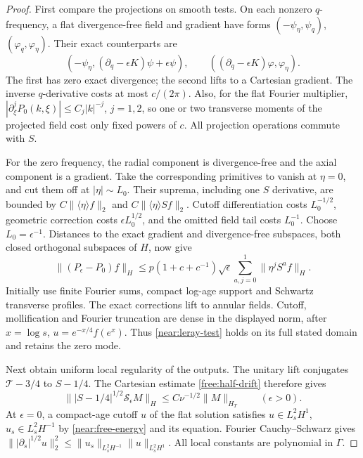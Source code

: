 \begin{proof}
First compare the projections on smooth tests. On each nonzero
\(q\)-frequency, a flat divergence-free field and gradient have forms
\((-\psi_\eta,\psi_q)\), \((\varphi_q,\varphi_\eta)\).
Their exact counterparts are
\[
 (-\psi_\eta,(\partial_q-\epsilon K)\psi+\epsilon\psi),
 \qquad ((\partial_q-\epsilon K)\varphi,\varphi_\eta).
\]
The first has zero exact divergence; the second lifts to a Cartesian
gradient. The inverse \(q\)-derivative costs at most \(c/(2\pi)\).
Also, for the flat Fourier multiplier,
\(|\partial_\xi^jP_0(k,\xi)|\le C_j|k|^{-j}\), \(j=1,2\),
so one or two transverse moments of the projected field cost only
fixed powers of \(c\). All projection operations commute with \(S\).

For the zero frequency, the radial component is divergence-free and the
axial component is a gradient. Take the corresponding primitives to
vanish at \(\eta=0\), and cut them off at \(|\eta|\sim L_0\).
Their suprema, including one \(S\) derivative, are bounded by
\(C\|\langle\eta\rangle f\|_2\) and
\(C\|\langle\eta\rangle Sf\|_2\).
Cutoff differentiation costs \(L_0^{-1/2}\), geometric correction
costs \(\epsilon L_0^{1/2}\), and the omitted field tail costs
\(L_0^{-1}\). Choose \(L_0=\epsilon^{-1}\).
Distances to the exact gradient and divergence-free subspaces, both closed
orthogonal subspaces of \(H\), now give
\begin{equation}\label{near:leray-test}
 \|(P_\epsilon-P_0)f\|_H
 \le p(1+c+c^{-1})\sqrt\epsilon
              \sum_{a,j=0}^1\|\eta^jS^af\|_H.
\end{equation}
Initially use finite Fourier sums, compact log-age support and Schwartz
transverse profiles. The exact corrections lift to annular fields.
Cutoff, mollification and Fourier truncation are dense in the displayed
norm, after \(x=\log s\), \(u=e^{-x/4}f(e^x)\).
Thus \eqref{near:leray-test} holds on its full stated domain and retains
the zero mode.

Next obtain uniform local regularity of the outputs.
The unitary lift conjugates \(\mathcal T-3/4\) to \(S-1/4\).
The Cartesian estimate \eqref{free:half-drift} therefore gives
\[
 \||S-1/4|^{1/2}\mathcal S_\epsilon M\|_H
           \le C\nu^{-1/2}\|M\|_{H_T}\qquad(\epsilon>0).
\]
At \(\epsilon=0\), a compact-age cutoff \(u\) of the flat solution
satisfies \(u\in L_s^2H^1\), \(u_s\in L_s^2H^{-1}\) by
\eqref{near:free-energy} and its equation. Fourier Cauchy--Schwarz gives
\(\||\partial_s|^{1/2}u\|_2^2\le
\|u_s\|_{L_s^2H^{-1}}\|u\|_{L_s^2H^1}\).
All local constants are polynomial in \(\Gamma\).


\end{proof}

